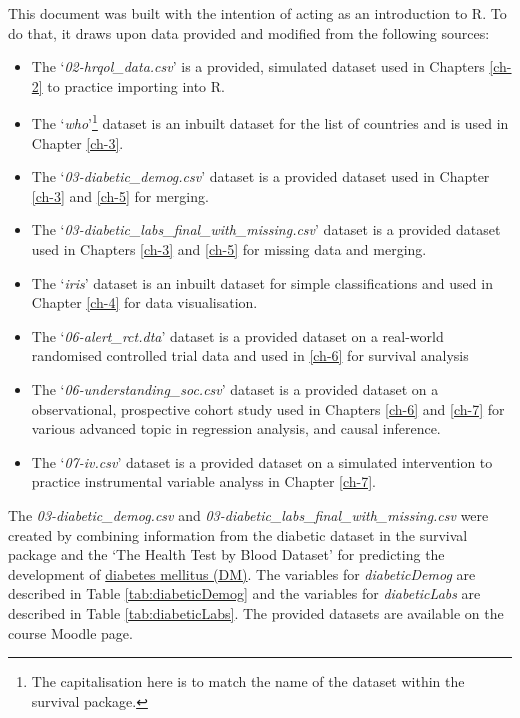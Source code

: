 \documentclass[
]{book}
\providecommand{\tightlist}{%
  \setlength{\itemsep}{0pt}\setlength{\parskip}{0pt}}
\begin{document}
This document was built with the intention of acting as an introduction to R. To
do that, it draws upon data provided and modified from the following sources:

\begin{itemize}
\tightlist
\item
  The `\emph{02-hrqol\_data.csv}' is a provided, simulated dataset used in
  Chapters \ref{ch-2} to practice importing into R.
\item
  The `\emph{who}'\footnote{The capitalisation here is to match the name of the dataset within
    the survival package.} dataset is an inbuilt dataset for the list of
  countries and is used in Chapter \ref{ch-3}.
\item
  The `\emph{03-diabetic\_demog.csv}' dataset is a provided dataset used in Chapter
  \ref{ch-3} and \ref{ch-5} for merging.
\item
  The `\emph{03-diabetic\_labs\_final\_with\_missing.csv}' dataset is a provided dataset
  used in Chapters \ref{ch-3} and \ref{ch-5} for missing data and merging.
\item
  The `\emph{iris}' dataset is an inbuilt dataset for simple classifications and
  used in Chapter \ref{ch-4} for data visualisation.
\item
  The `\emph{06-alert\_rct.dta}' dataset is a provided dataset on a real-world
  randomised controlled trial data \citep{holdaas2003effect} and used
  in \ref{ch-6} for survival analysis
\item
  The `\emph{06-understanding\_soc.csv}' dataset is a provided dataset on a
  observational, prospective cohort study \citep{buck2012understanding} used in
  Chapters \ref{ch-6} and \ref{ch-7} for various advanced topic in
  regression analysis, and causal inference.
\item
  The `\emph{07-iv.csv}' dataset is a provided dataset on a simulated intervention
  to practice instrumental variable analyss in Chapter \ref{ch-7}.
\end{itemize}

The \emph{03-diabetic\_demog.csv} and \emph{03-diabetic\_labs\_final\_with\_missing.csv} were
created by combining information from the diabetic dataset in the survival package
and the `The Health Test by Blood Dataset' \citep{kaggleDM} for predicting the
development of \hyperref[acronyms_DM]{diabetes mellitus (DM)}. The variables for \emph{diabeticDemog} are described in
Table \ref{tab:diabeticDemog} and the variables for \emph{diabeticLabs} are described
in Table \ref{tab:diabeticLabs}. The provided datasets are available on the
course Moodle page.
\end{document}

